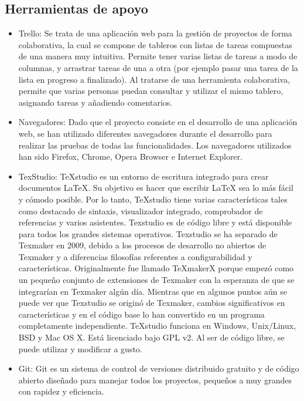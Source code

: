 \documentclass[12pt, a4paper, twoside]{book}
\begin{document}
	\subsection{Herramientas de apoyo}
	\begin{itemize}
		\item Trello: Se trata de una aplicación web para la gestión de proyectos de forma colaborativa, la cual se compone de tableros con listas de tareas compuestas de una manera muy intuitiva. Permite tener varias listas de tareas a modo de columnas, y arrastrar tareas de una a otra (por ejemplo pasar una tarea de la lista en progreso a finalizado). Al tratarse de una herramienta colaborativa, permite que varias personas puedan consultar y utilizar el mismo tablero, asignando tareas y añadiendo comentarios.
		\item Navegadores: Dado que el proyecto consiste en el desarrollo de una aplicación web, se han utilizado diferentes navegadores durante el desarrollo para realizar las pruebas de todas las funcionalidades. Los navegadores utilizados han sido Firefox, Chrome, Opera Browser e Internet Explorer.
		\item TexStudio: TeXstudio es un entorno de escritura integrado para crear documentos LaTeX. Su objetivo es hacer que escribir LaTeX sea lo más fácil y cómodo posible. Por lo tanto, TeXstudio tiene varias características tales como destacado de sintaxis, visualizador integrado, comprobador de referencias y varios asistentes. 
		Texstudio es de código libre y está disponible para todos los grandes sistemas operativos. Texstudio se ha separado de Texmaker en 2009, debido a los procesos de desarrollo no abiertos de Texmaker y a diferencias filosofías referentes a configurabilidad y características. Originalmente fue llamado TeXmakerX porque empezó como un pequeño conjunto de extensiones de Texmaker con la esperanza de que se integrarían en Texmaker algún día. Mientras que en algunos puntos aún se puede ver que Texstudio se originó de Texmaker, cambios significativos en características y en el código base lo han convertido en un programa completamente independiente. 
		TeXstudio funciona en Windows, Unix/Linux, BSD y Mac OS X. Está licenciado bajo GPL v2. Al ser de código libre, se puede utilizar y modificar a gusto.\cite{TexStudio}
		\item Git\cite{Git}:
		Git es un sistema de control de versiones distribuido gratuito y de código abierto diseñado para manejar todos los proyectos, pequeños a muy grandes con rapidez y eficiencia.
		

\end{itemize}
\end{document}
